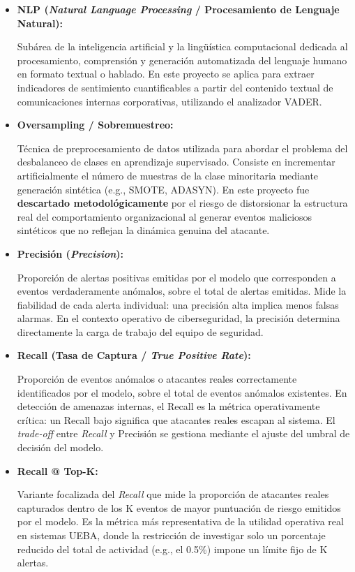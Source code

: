 \documentclass[IB]{TFUOC}%
\begin{document}
\begin{itemize}
    \item \textbf{NLP (\textit{Natural Language Processing} / Procesamiento de Lenguaje Natural):}
    
    Subárea de la inteligencia artificial y la lingüística computacional dedicada al procesamiento, comprensión y generación automatizada del lenguaje humano en formato textual o hablado. En este proyecto se aplica para extraer indicadores de sentimiento cuantificables a partir del contenido textual de comunicaciones internas corporativas, utilizando el analizador VADER.

    \item \textbf{Oversampling / Sobremuestreo:}
    
    Técnica de preprocesamiento de datos utilizada para abordar el problema del desbalanceo de clases en aprendizaje supervisado. Consiste en incrementar artificialmente el número de muestras de la clase minoritaria mediante generación sintética (e.g., SMOTE, ADASYN). En este proyecto fue \textbf{descartado metodológicamente} por el riesgo de distorsionar la estructura real del comportamiento organizacional al generar eventos maliciosos sintéticos que no reflejan la dinámica genuina del atacante.

    \item \textbf{Precisión (\textit{Precision}):}
    
    Proporción de alertas positivas emitidas por el modelo que corresponden a eventos verdaderamente anómalos, sobre el total de alertas emitidas. Mide la fiabilidad de cada alerta individual: una precisión alta implica menos falsas alarmas. En el contexto operativo de ciberseguridad, la precisión determina directamente la carga de trabajo del equipo de seguridad.

    \item \textbf{Recall (Tasa de Captura / \textit{True Positive Rate}):}
    
    Proporción de eventos anómalos o atacantes reales correctamente identificados por el modelo, sobre el total de eventos anómalos existentes. En detección de amenazas internas, el Recall es la métrica operativamente crítica: un Recall bajo significa que atacantes reales escapan al sistema. El \textit{trade-off} entre \textit{Recall} y Precisión se gestiona mediante el ajuste del umbral de decisión del modelo.

    \item \textbf{Recall @ Top-K:}
    
    Variante focalizada del \textit{Recall} que mide la proporción de atacantes reales capturados dentro de los K eventos de mayor puntuación de riesgo emitidos por el modelo. Es la métrica más representativa de la utilidad operativa real en sistemas UEBA, donde la restricción de investigar solo un porcentaje reducido del total de actividad (e.g., el 0.5\%) impone un límite fijo de K alertas.


\end{itemize}
\end{document}
